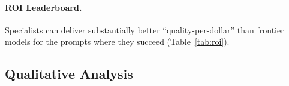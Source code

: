 \begin{table}[t]
\centering
\small
\caption{\textbf{System Impact.} Adaptive routing improves quality while reducing cost vs.\ a frontier-only policy.}
\label{tab:system_impact}
\end{table}

\paragraph{ROI Leaderboard.} Specialists can deliver substantially better ``quality-per-dollar'' than frontier models for the prompts where they succeed (Table~\ref{tab:roi}).

\begin{table}[t]
\centering
\small
\caption{\textbf{ROI Leaderboard.} Specialists deliver substantially better value than GPT-4o in their niches.}
\label{tab:roi}
\end{table}


\subsection{Qualitative Analysis}
\label{sec:qualitative}

